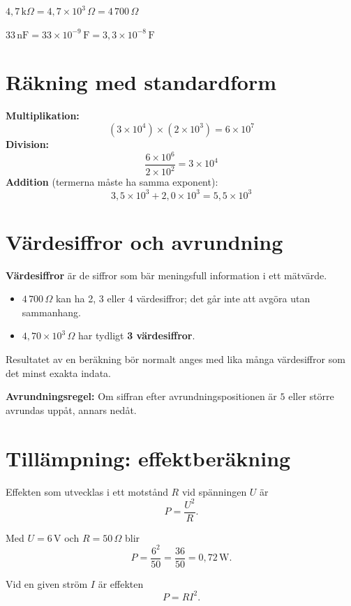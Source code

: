 \begin{exempel}
$4{,}7\,\text{k}\Omega = 4{,}7 \times 10^3\,\Omega = 4\,700\,\Omega$
\end{exempel}

\begin{exempel}
$33\,\text{nF} = 33 \times 10^{-9}\,\text{F} = 3{,}3 \times 10^{-8}\,\text{F}$
\end{exempel}

\section{Räkning med standardform}
\label{c5:sec:rakning}
\textbf{Multiplikation:}
\[
  (3 \times 10^4) \times (2 \times 10^3) = 6 \times 10^7
\]
\textbf{Division:}
\[
  \frac{6 \times 10^6}{2 \times 10^2} = 3 \times 10^4
\]
\textbf{Addition} (termerna måste ha samma exponent):
\[
  3{,}5 \times 10^3 + 2{,}0 \times 10^3 = 5{,}5 \times 10^3
\]

\section{Värdesiffror och avrundning}
\label{c5:sec:vardesiffror}
\textbf{Värdesiffror} är de siffror som bär meningsfull information i ett mätvärde.
\begin{itemize}
  \item $4\,700\,\Omega$ kan ha 2, 3 eller 4 värdesiffror; det går inte att avgöra utan
    sammanhang.
  \item $4{,}70 \times 10^3\,\Omega$ har tydligt \textbf{3 värdesiffror}.
\end{itemize}
Resultatet av en beräkning bör normalt anges med lika många värdesiffror som det minst exakta
indata.

\textbf{Avrundningsregel:} Om siffran efter avrundningspositionen är $5$ eller större avrundas
uppåt, annars nedåt.

\section{Tillämpning: effektberäkning}
\label{c5:sec:effekt}
Effekten som utvecklas i ett motstånd $R$ vid spänningen $U$ är
\[
  P = \frac{U^2}{R}.
\]

\begin{exempel}
Med $U = 6\,\text{V}$ och $R = 50\,\Omega$ blir
\[
  P = \frac{6^2}{50} = \frac{36}{50} = 0{,}72\,\text{W}.
\]
\end{exempel}

Vid en given ström $I$ är effekten
\[
  P = RI^2.
\]

